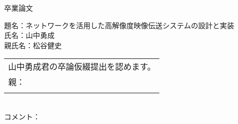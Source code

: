 \documentclass[a4paper,12pt]{jarticle}
\begin{document}
\begin{center}
{\large 卒業論文}\vspace{.5ex}
\large
\end{center}
\hfill{}

\noindent
題名：ネットワークを活用した高解像度映像伝送システムの設計と実装\\
氏名：山中勇成\\
親氏名：松谷健史\\[1ex]%

\noindent
\begin{tabular}{|p{15.1cm}|}
\hline
山中勇成君の卒論仮綴提出を認めます。\\
親：\\\\
\hline
\end{tabular}
\\[2ex]%

\noindent
コメント：\\
\end{document}

